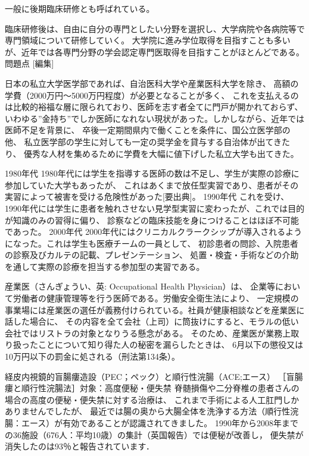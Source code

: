 一般に後期臨床研修とも呼ばれている。

臨床研修後は、自由に自分の専門としたい分野を選択し、大学病院や各病院等で専門領域について研修していく。
大学院に進み学位取得を目指すことも多いが、近年では各専門分野の学会認定専門医取得を目指すことがほとんどである。
問題点 [編集]

日本の私立大学医学部であれば、自治医科大学や産業医科大学を除き、
高額の学費（2000万円～5000万円程度）が必要となることが多く、
これを支払えるのは比較的裕福な層に限られており、医師を志す者全てに門戸が開かれておらず、
いわゆる”金持ち”でしか医師になれない現状があった。しかしながら、近年では医師不足を背景に、
卒後一定期間県内で働くことを条件に、国公立医学部の他、
私立医学部の学生に対しても一定の奨学金を貸与する自治体が出てきたり、
優秀な人材を集めるために学費を大幅に値下げした私立大学も出てきた。

1980年代
1980年代には学生を指導する医師の数は不足し、学生が実際の診療に参加していた大学もあったが、
これはあくまで放任型実習であり、患者がその実習によって被害を受ける危険性があった[要出典]。
1990年代
これを受け、1990年代には学生に患者を触れさせない見学型実習に変わったが、これでは目的が知識のみの習得に偏り、
診察などの臨床技能を身につけることはほぼ不可能であった。
2000年代
2000年代にはクリニカルクラークシップが導入されるようになった。これは学生も医療チームの一員として、
初診患者の問診、入院患者の診察及びカルテの記載、プレゼンテーション、
処置・検査・手術などの介助を通して実際の診療を担当する参加型の実習である。


産業医（さんぎょうい、英: Occupational Health Physician）は、
企業等において労働者の健康管理等を行う医師である。労働安全衛生法により、
一定規模の事業場には産業医の選任が義務付けられている。社員が健康相談などを産業医に話した場合に、
その内容を全て会社（上司）に筒抜けにすると、モラルの低い会社ではリストラの対象となりうる懸念がある。
そのため、産業医が業務上取り扱ったことについて知り得た人の秘密を漏らしたときは、
6月以下の懲役又は10万円以下の罰金に処される（刑法第134条）。

経皮内視鏡的盲腸瘻造設（PEC；ペック）と順行性浣腸（ACE;エース）
［盲腸瘻と順行性浣腸法］対象：高度便秘・便失禁
脊髄損傷や二分脊椎の患者さんの場合の高度の便秘・便失禁に対する治療は、
これまで手術による人工肛門しかありませんでしたが、
最近では腸の奥から大腸全体を洗浄する方法（順行性浣腸：エース）が有効であることが認識されてきました。
1990年から2008年までの36施設（676人：平均10歳）の集計（英国報告）では便秘が改善し，
便失禁が消失したのは93％と報告されています． 

